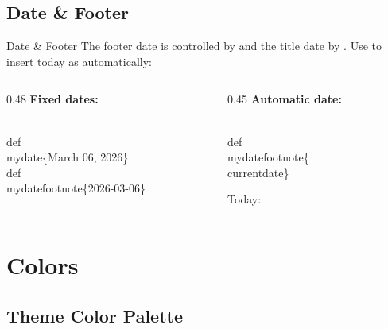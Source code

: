 \documentclass[presentation, aspectratio=169]{beamer}
\def\mydate{09 March, 2026}
\def\mydatefootnote{2026-03-06}
\begin{document}
\subsection{Date \& Footer}

\begin{frame}[fragile]{Date \& Footer}
  The footer date is controlled by \inlinecode{\\mydatefootnote} and the title date by \inlinecode{\\mydate}.
  Use \inlinecode{\\currentdate} to insert today as  automatically:

  \vspace{0.4em}
  \begin{columns}
    \begin{column}{0.48\columnwidth}
      \textbf{Fixed dates:}
\begin{codeblock}
\\def\\mydate\{March 06, 2026\}
\\def\\mydatefootnote\{2026-03-06\}
\end{codeblock}
    \end{column}
    \begin{column}{0.45\columnwidth}
      \textbf{Automatic date:}
\begin{codeblock}
\\def\\mydatefootnote\{\\currentdate\}
\end{codeblock}
      Today: \currentdate{}
    \end{column}
  \end{columns}
\end{frame}

\section{Colors}

\subsection{Theme Color Palette}
\end{document}
